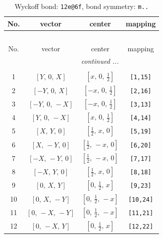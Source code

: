 \documentclass[fleqn,8pt]{jsarticle}
\begin{document}
\renewcommand{\arraystretch}{1.2}
\begin{longtable}{cccc}
\caption{Wyckoff bond: {\tt 12e@6f}, bond symmetry: {\tt m..}}
 \\
 \hline \hline
No. & vector & center & mapping \\ \hline \endfirsthead

\multicolumn{3}{l}{\tablename\ \thetable{}} \\
 \hline \hline
No. & vector & center & mapping \\ \hline \endhead

 \hline \hline
\multicolumn{3}{r}{\footnotesize\it continued ...} \\ \endfoot

 \hline \hline
\multicolumn{3}{r}{} \\ \endlastfoot

1 & $\left[ Y,\, 0,\, X \right]$ & $\left[ x,\, 0,\, \frac{1}{2} \right]$ & {\tt [1,15]} \\ \hline
2 & $\left[ - Y,\, 0,\, X \right]$ & $\left[ - x,\, 0,\, \frac{1}{2} \right]$ & {\tt [2,16]} \\ \hline
3 & $\left[ - Y,\, 0,\, - X \right]$ & $\left[ - x,\, 0,\, \frac{1}{2} \right]$ & {\tt [3,13]} \\ \hline
4 & $\left[ Y,\, 0,\, - X \right]$ & $\left[ x,\, 0,\, \frac{1}{2} \right]$ & {\tt [4,14]} \\ \hline
5 & $\left[ X,\, Y,\, 0 \right]$ & $\left[ \frac{1}{2},\, x,\, 0 \right]$ & {\tt [5,19]} \\ \hline
6 & $\left[ X,\, - Y,\, 0 \right]$ & $\left[ \frac{1}{2},\, - x,\, 0 \right]$ & {\tt [6,20]} \\ \hline
7 & $\left[ - X,\, - Y,\, 0 \right]$ & $\left[ \frac{1}{2},\, - x,\, 0 \right]$ & {\tt [7,17]} \\ \hline
8 & $\left[ - X,\, Y,\, 0 \right]$ & $\left[ \frac{1}{2},\, x,\, 0 \right]$ & {\tt [8,18]} \\ \hline
9 & $\left[ 0,\, X,\, Y \right]$ & $\left[ 0,\, \frac{1}{2},\, x \right]$ & {\tt [9,23]} \\ \hline
10 & $\left[ 0,\, X,\, - Y \right]$ & $\left[ 0,\, \frac{1}{2},\, - x \right]$ & {\tt [10,24]} \\ \hline
11 & $\left[ 0,\, - X,\, - Y \right]$ & $\left[ 0,\, \frac{1}{2},\, - x \right]$ & {\tt [11,21]} \\ \hline
12 & $\left[ 0,\, - X,\, Y \right]$ & $\left[ 0,\, \frac{1}{2},\, x \right]$ & {\tt [12,22]} \\
\end{longtable}
\end{document}
